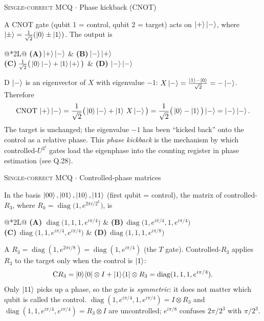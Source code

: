 \documentclass[11pt,a4paper]{article}
\newcommand{\optlabel}[1]{\textbf{(#1)}}
\newcommand{\correctlabel}[1]{\textcolor{okgreen}{\textbf{(#1)}\,\ding{51}}}
\newenvironment{qitem}[1]{\begin{list}{}{\setlength{\leftmargin}{3.3em}\setlength{\labelwidth}{3.1em}%
  \setlength{\labelsep}{0.2em}\setlength{\topsep}{3pt}\setlength{\parsep}{3pt}}\item[\textbf{Q.#1}\hfill]}{\end{list}}
\newcommand{\qsep}{\par\vspace{2pt}{\color{black!15}\hrule}\vspace{4pt}}
\newcommand{\qmeta}[2]{{\footnotesize\color{black!60}\textsc{#1} \;$\cdot$\; #2}\par}
\begin{document}
\begin{qitem}{26}
\qmeta{Single-correct MCQ}{Phase kickback (CNOT)}
A CNOT gate (qubit 1 = control, qubit 2 = target) acts on $\ket{+}\ket{-}$, where
$\ket{\pm} = \frac{1}{\sqrt2}(\ket0 \pm \ket1)$. The output is
\par\smallskip\noindent\begin{tabularx}{\linewidth}{@{}*{2}{L}@{}}
\optlabel{A}\,$\ket{+}\ket{-}$ & \optlabel{B}\,$\ket{-}\ket{+}$ \\[3pt]
\optlabel{C}\,$\frac{1}{\sqrt2}\big(\ket{0}\ket{-} + \ket{1}\ket{+}\big)$ & \correctlabel{D}\,$\ket{-}\ket{-}$
\end{tabularx}
\end{qitem}
\begin{solbox}{D}
$\ket{-}$ is an eigenvector of $X$ with eigenvalue $-1$: $X\ket{-} = \frac{\ket1 - \ket0}{\sqrt2} = -\ket{-}$. Therefore
\[ \mathrm{CNOT}\,\ket{+}\ket{-} = \frac{1}{\sqrt2}\big(\ket0\ket{-} + \ket1\,X\ket{-}\big) = \frac{1}{\sqrt2}\big(\ket0 - \ket1\big)\ket{-}
   = \ket{-}\ket{-}. \]
The target is unchanged; the eigenvalue $-1$ has been ``kicked back'' onto the control as a relative phase. This
\emph{phase kickback} is the mechanism by which controlled-$U^{2^j}$ gates load the eigenphase into the counting
register in phase estimation (see Q.28).
\end{solbox}
\qsep

\begin{qitem}{27}
\qmeta{Single-correct MCQ}{Controlled-phase matrices}
In the basis $\ket{00}, \ket{01}, \ket{10}, \ket{11}$ (first qubit = control), the matrix of controlled-$R_3$, where
$R_k = \operatorname{diag}\big(1, e^{2\pi i/2^k}\big)$, is
\par\smallskip\noindent\begin{tabularx}{\linewidth}{@{}*{2}{L}@{}}
\correctlabel{A}\,$\operatorname{diag}\big(1, 1, 1, e^{i\pi/4}\big)$ & \optlabel{B}\,$\operatorname{diag}\big(1, e^{i\pi/4}, 1, e^{i\pi/4}\big)$ \\[3pt]
\optlabel{C}\,$\operatorname{diag}\big(1, 1, e^{i\pi/4}, e^{i\pi/4}\big)$ & \optlabel{D}\,$\operatorname{diag}\big(1, 1, 1, e^{i\pi/8}\big)$
\end{tabularx}
\end{qitem}
\begin{solbox}{A}
$R_3 = \operatorname{diag}(1, e^{2\pi i/8}) = \operatorname{diag}(1, e^{i\pi/4})$ (the $T$ gate). Controlled-$R_3$ applies $R_3$
to the target only when the control is $\ket1$:
\[ \mathrm{C}R_3 = \ket0\!\bra0 \otimes I + \ket1\!\bra1 \otimes R_3 = \operatorname{diag}(1, 1, 1, e^{i\pi/4}). \]
Only $\ket{11}$ picks up a phase, so the gate is \emph{symmetric}: it does not matter which qubit is called the control.
$\operatorname{diag}(1, e^{i\pi/4}, 1, e^{i\pi/4}) = I\otimes R_3$ and $\operatorname{diag}(1,1,e^{i\pi/4},e^{i\pi/4}) = R_3 \otimes I$ are
uncontrolled; $e^{i\pi/8}$ confuses $2\pi/2^3$ with $\pi/2^3$.
\end{solbox}
\qsep
\end{document}
